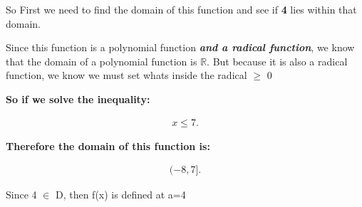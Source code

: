 \documentclass{report}
\begin{document}
        \bigbreak \noindent 
        So First we need to find the domain of this function and see if \textbf{4} lies within
        that domain.

        \bigbreak \noindent 
        Since this function is a polynomial function \textbf{\textit{and a radical function}}, 
        we know that the domain of a polynomial function is $\mathbb{R}$. But because it is 
        also a radical function, we know we must set whats inside the radical $\geq$ 0 

        \bigbreak \noindent 
        \textbf{So if we solve the inequality:} 

        \begin{align*}
            x \leq 7
        .\end{align*}

        \bigbreak \noindent 
        \textbf{Therefore the domain of this function is:}

        \begin{align*}
            (-8, 7] 
        .\end{align*} 

        \bigbreak \noindent 

        \bigbreak \noindent 
        Since 4 $\in$ D, then f(x) is defined at a=4
\end{document}
